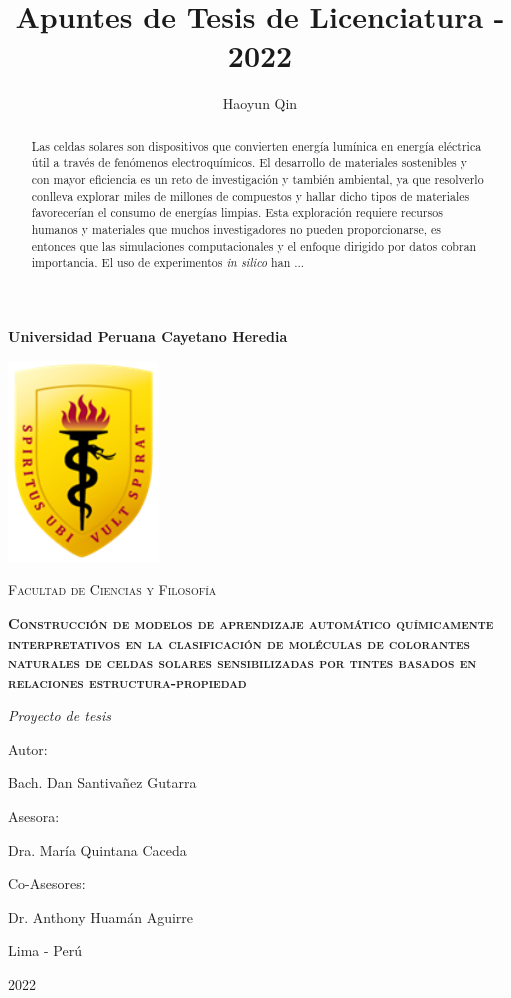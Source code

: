 \documentclass{article}
\title{Apuntes de Tesis de Licenciatura - 2022}
\author{Haoyun Qin}
\theoremstyle{mytheoremstyle}
\theoremstyle{mytheoremstyle}
\theoremstyle{myproblemstyle}
\begin{document}
    \begin{titlepage}
        \centering
        {\bfseries\LARGE Universidad Peruana Cayetano Heredia \par}
        \vspace{1cm}
        {\includegraphics[width=0.3\textwidth]{img/logo_escudo.png}\par}
        \vspace{1cm}
        {\scshape\Large Facultad de Ciencias y Filosofía \par}
        \vspace{1cm}
        {\bfseries\scshape\Large Construcción de modelos de aprendizaje automático químicamente interpretativos en la clasificación de moléculas de colorantes naturales de celdas solares sensibilizadas por tintes basados en relaciones estructura-propiedad \par}
        \vspace{1cm}
        {\itshape\Large Proyecto de tesis \par}
        \vfill
        {\Large Autor: \par}
        {\Large Bach. Dan Santivañez Gutarra\par}
        \vfill
        {\Large Asesora: \par}
        {\Large Dra. María Quintana Caceda \par}
        {\Large Co-Asesores: \par}
        {\Large Dr. Anthony Huamán Aguirre \par}
        \vfill
        {\Large Lima - Perú \par}
        {\Large 2022 \par}
    \end{titlepage}

    \tableofcontents
    \newpage

    \begin{abstract}
        Las celdas solares son dispositivos que convierten energía lumínica en 
        energía eléctrica útil a través de fenómenos electroquímicos. El desarrollo
        de materiales sostenibles y con mayor eficiencia es un reto de investigación
        y también ambiental, ya que resolverlo conlleva explorar miles de millones de 
        compuestos y hallar dicho tipos de materiales favorecerían el consumo de 
        energías limpias. Esta exploración requiere recursos humanos y materiales que
        muchos investigadores no pueden proporcionarse, es entonces que las simulaciones
        computacionales y el enfoque dirigido por datos cobran importancia. El uso de 
        experimentos \textit{in silico} han ... 
    \end{abstract}
\end{document}
